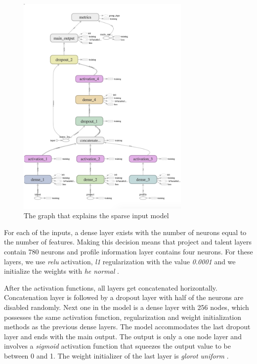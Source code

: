  \begin{figure}[htp]
	\centering
	\includegraphics[width=0.75\textwidth]{figures/TensorBoardSparseCropped.png}
	\caption{The graph that explains the sparse input model}
	\label{fig:tensor-board-sparse}
\end{figure}

For each of the inputs, a dense layer exists with the number of neurons equal to the number of features. Making this decision means that project and talent layers contain 780 neurons and profile information layer contains four neurons. For these layers, we use \textit{relu} activation, \textit{l1} regularization with the value \textit{0.0001} and we initialize the weights with \textit{he normal} \cite{hanin2018start}.


After the activation functions, all layers get concatenated horizontally. Concatenation layer is followed by a dropout layer with half of the neurons are disabled randomly. Next one in the model is a dense layer with 256 nodes, which possesses the same activation function, regularization and weight initialization methods as the previous dense layers. The model accommodates the last dropout layer and ends with the main output. The output is only a one node layer and involves a \textit{sigmoid} activation function that squeezes the output value to be between 0 and 1. The weight initializer of the last layer is \textit{glorot uniform} \cite{pedamonti2018comparison}.

